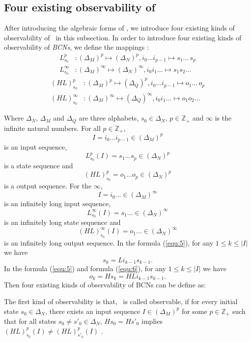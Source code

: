 \subsection{Four existing observability of \BCNs}
After introducing the algebraic forms of \BCNs, we introduce four existing kinds of observability of \BCNs\ in this subsection. In order to introduce four existing kinds of observability of {\em BCNs}, we define the mappings \cite{Zhang2016Observability}:
\begin{equation}
\begin{split}
L^p_{s_0} &: (\Delta_M)^p\mapsto(\Delta_N)^p, i_0\ldots i_{p-1} \mapsto s_1 \ldots\, s_p\\
L^{\infty}_{s_0} &: (\Delta_M)^{\infty}\mapsto(\Delta_N)^{\infty}, i_0 i_1 \ldots  \mapsto s_1 s_2 \ldots
\end{split}
\label{equ:5}
\end{equation}
\begin{equation}
\begin{split}
(HL)^p_{s_0} &: (\Delta_M)^p\mapsto(\Delta_Q)^p, i_0\ldots i_{p-1} \mapsto o_1\ldots\, o_p\\
(HL)^{\infty}_{s_0} &: (\Delta_M)^{\infty}\mapsto(\Delta_Q)^{\infty}, i_0 i_1 \ldots  \mapsto o_1 o_2\ldots
\end{split}
\label{equ:6}
\end{equation}

Where $\Delta_N$, $\Delta_M$ and $\Delta_Q$ are three alphabets, $s_0\in \Delta_N$, $p\in \mathbb{Z}_+$ and $\infty$ is the infinite natural numbers. For all  $p\in \mathbb{Z}_+$, \[I=i_0 \ldots i_{p-1} \in(\Delta_M)^p\] is an input sequence, \[L^p_{s_0}(I)=s_1 \ldots s_{p} \in(\Delta_N)^p\] is a state sequence and \[(HL)^p_{s_0}=o_1 \ldots o_{p} \in(\Delta_N)^p\] is a output sequence. For the $\infty$, \[I=i_0 \ldots  \in(\Delta_M)^{\infty}\] is an infinitely long input sequence, \[L^{\infty}_{s_0}(I)=s_1 \ldots  \in(\Delta_N)^{\infty}\] is an infinitely long state sequence and \[(HL)^{\infty}_{s_0}(I)=o_1 \ldots \in(\Delta_N)^{\infty}\] is an infinitely long output sequence. In the formula (\ref{equ:5}), for any $1\le k \le |I|$ we have \[s_k=Li_{k-1}s_{k-1}.\] In the formula (\ref{equ:5}) and formula (\ref{equ:6}), for any $1\le k \le |I|$ we have  \[o_k=Hs_k=HLi_{k-1}s_{k-1}.\] Then four existing kinds of observability of BCNs can be define as: 
\begin{definition}
The first kind of observability is that, \BCN\ is called observable, if for every initial state $s_0 \in \Delta_N$, there exists an input sequence $I\in(\Delta_M)^p$ for some $p\in \mathbb{Z}_+$ such that for all states $s_0\neq {s'}_0\in \Delta_N$, $Hs_0=H{s'}_0$ implies $(HL)^p_{s_0}(I)\neq (HL)^p_{{s'}_0}(I)$ \cite{cheng2009controllability}.
\end{definition}

